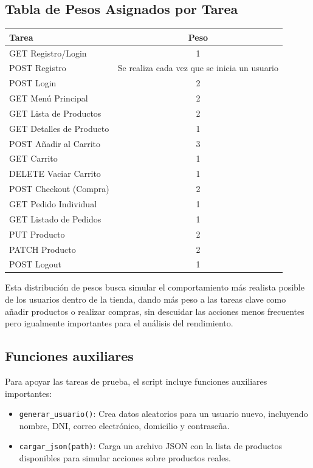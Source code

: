 \documentclass[10pt]{book}
\begin{document}
\subsection*{Tabla de Pesos Asignados por Tarea}

\begin{center}
\begin{tabular}{|l|c|}
\hline
\textbf{Tarea} & \textbf{Peso} \\
\hline
GET Registro/Login & 1 \\
POST Registro & Se realiza cada vez que se inicia un usuario \\
POST Login & 2 \\
GET Menú Principal & 2 \\
GET Lista de Productos & 2 \\
GET Detalles de Producto & 1 \\
POST Añadir al Carrito & 3 \\
GET Carrito & 1 \\
DELETE Vaciar Carrito & 1 \\
POST Checkout (Compra) & 2 \\
GET Pedido Individual & 1 \\
GET Listado de Pedidos & 1 \\
PUT Producto & 2 \\
PATCH Producto & 2 \\
POST Logout & 1 \\
\hline
\end{tabular}
\end{center}

Esta distribución de pesos busca simular el comportamiento más realista posible de los usuarios dentro de la tienda, dando más peso a las tareas clave como añadir productos o realizar compras, sin descuidar las acciones menos frecuentes pero igualmente importantes para el análisis del rendimiento.

\subsection{Funciones auxiliares}

Para apoyar las tareas de prueba, el script incluye funciones auxiliares importantes:

\begin{itemize}
    \item \texttt{generar\_usuario()}: Crea datos aleatorios para un usuario nuevo, incluyendo nombre, DNI, correo electrónico, domicilio y contraseña.
    \item \texttt{cargar\_json(path)}: Carga un archivo JSON con la lista de productos disponibles para simular acciones sobre productos reales.
\end{itemize}
\end{document}
